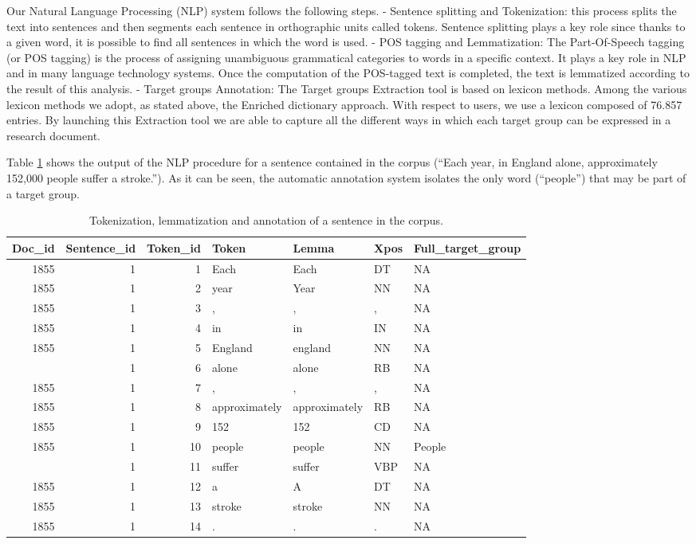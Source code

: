 \documentclass[]{book}
\theoremstyle{definition}
\theoremstyle{definition}
\theoremstyle{definition}
\theoremstyle{remark}
\begin{document}
Our Natural Language Processing (NLP) system follows the following
steps. - Sentence splitting and Tokenization: this process splits the
text into sentences and then segments each sentence in orthographic
units called tokens. Sentence splitting plays a key role since thanks to
a given word, it is possible to find all sentences in which the word is
used. - POS tagging and Lemmatization: The Part-Of-Speech tagging (or
POS tagging) is the process of assigning unambiguous grammatical
categories to words in a specific context. It plays a key role in NLP
and in many language technology systems. Once the computation of the
POS-tagged text is completed, the text is lemmatized according to the
result of this analysis. - Target groups Annotation: The Target groups
Extraction tool is based on lexicon methods. Among the various lexicon
methods we adopt, as stated above, the Enriched dictionary approach.
With respect to users, we use a lexicon composed of 76.857 entries. By
launching this Extraction tool we are able to capture all the different
ways in which each target group can be expressed in a research document.

Table \ref{tab:impact1} shows the output of the NLP procedure for a
sentence contained in the corpus (``Each year, in England alone,
approximately 152,000 people suffer a stroke.''). As it can be seen, the
automatic annotation system isolates the only word (``people'') that may
be part of a target group.

\begin{table}

\caption{\label{tab:impact1}Tokenization, lemmatization and annotation of a sentence in the corpus.}
\centering
\begin{tabular}[t]{rrrllll}
\toprule
Doc\_id & Sentence\_id & Token\_id & Token & Lemma & Xpos & Full\_target\_group\\
\midrule
1855 & 1 & 1 & Each & Each & DT & NA\\
1855 & 1 & 2 & year & Year & NN & NA\\
1855 & 1 & 3 & , & , & , & NA\\
1855 & 1 & 4 & in & in & IN & NA\\
1855 & 1 & 5 & England & england & NN & NA\\
\addlinespace
1855 & 1 & 6 & alone & alone & RB & NA\\
1855 & 1 & 7 & , & , & , & NA\\
1855 & 1 & 8 & approximately & approximately & RB & NA\\
1855 & 1 & 9 & 152 & 152 & CD & NA\\
1855 & 1 & 10 & people & people & NN & People\\
\addlinespace
1855 & 1 & 11 & suffer & suffer & VBP & NA\\
1855 & 1 & 12 & a & A & DT & NA\\
1855 & 1 & 13 & stroke & stroke & NN & NA\\
1855 & 1 & 14 & . & . & . & NA\\
\bottomrule
\end{tabular}
\end{table}
\end{document}
